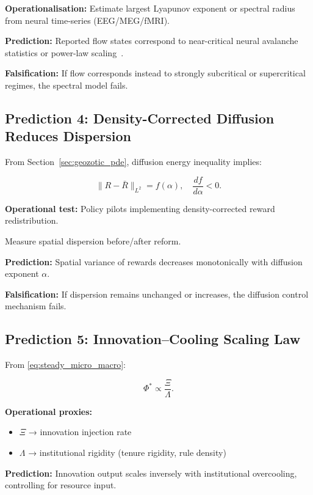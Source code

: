 \documentclass[12pt,a4paper]{article}
\theoremstyle{definition}
\begin{document}
\textbf{Operationalisation:}
Estimate largest Lyapunov exponent or spectral radius
from neural time-series (EEG/MEG/fMRI).

\textbf{Prediction:}
Reported flow states correspond to
near-critical neural avalanche statistics
or power-law scaling~\citep{beggs2003,mora2011}.

\textbf{Falsification:}
If flow corresponds instead to strongly subcritical
or supercritical regimes,
the spectral model fails.

\subsection{Prediction 4: Density-Corrected Diffusion Reduces Dispersion}

From Section~\ref{sec:geozotic_pde},
diffusion energy inequality implies:

\begin{equation}
  \|R - \bar{R}\|_{L^2}
  =
  f(\alpha),
  \quad
  \frac{df}{d\alpha} < 0.
\end{equation}

\textbf{Operational test:}
Policy pilots implementing density-corrected
reward redistribution.

Measure spatial dispersion before/after reform.

\textbf{Prediction:}
Spatial variance of rewards decreases
monotonically with diffusion exponent $\alpha$.

\textbf{Falsification:}
If dispersion remains unchanged or increases,
the diffusion control mechanism fails.

\subsection{Prediction 5: Innovation–Cooling Scaling Law}

From \eqref{eq:steady_micro_macro}:

\begin{equation}
  \Phi^*
  \propto
  \frac{\Xi}{\Lambda}.
\end{equation}

\textbf{Operational proxies:}
\begin{itemize}
  \item $\Xi$ → innovation injection rate
  \item $\Lambda$ → institutional rigidity (tenure rigidity, rule density)
\end{itemize}

\textbf{Prediction:}
Innovation output scales inversely
with institutional overcooling,
controlling for resource input.
\end{document}
